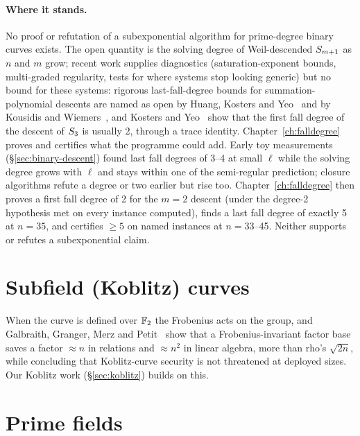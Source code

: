 \paragraph{Where it stands.} No proof or refutation of a subexponential
algorithm for prime-degree binary curves exists. The open quantity is the
solving degree of Weil-descended $S_{m+1}$ as $n$ and $m$ grow; recent
work supplies diagnostics (saturation-exponent bounds, multi-graded
regularity, tests for where systems stop looking generic) but no bound for
these systems: rigorous last-fall-degree bounds for summation-polynomial
descents are named as open by Huang, Kosters and Yeo~\cite{hky2015} and by
Kousidis and Wiemers~\cite{kousidis2019}, and Kosters and
Yeo~\cite{kosters2015notes} show that the first fall degree of the descent
of $S_{3}$ is usually 2, through a trace identity. Chapter~\ref{ch:falldegree}
proves and certifies what the programme could add. Early toy
measurements (\S\ref{sec:binary-descent}) found last fall degrees of
3--4 at small $\ell$ while the solving degree grows with $\ell$ and stays
within one of the semi-regular prediction; closure algorithms refute a
degree or two earlier but rise too. Chapter~\ref{ch:falldegree} then proves
a first fall degree of 2 for the $m=2$ descent (under the degree-2
hypothesis met on every instance computed), finds a last fall degree of
exactly 5 at $n=35$, and certifies $\ge5$ on named instances at
$n=33$--45. Neither supports or refutes a subexponential claim.

\section{Subfield (Koblitz) curves}

When the curve is defined over $\mathbb{F}_2$ the Frobenius acts on the group,
and Galbraith, Granger, Merz and Petit~\cite{ggmp2020} show that a
Frobenius-invariant factor base saves a factor $\approx n$ in relations and
$\approx n^2$ in linear algebra, more than rho's $\sqrt{2n}$, while
concluding that Koblitz-curve security is not threatened at deployed sizes.
Our Koblitz work (\S\ref{sec:koblitz}) builds on this.

\section{Prime fields}

